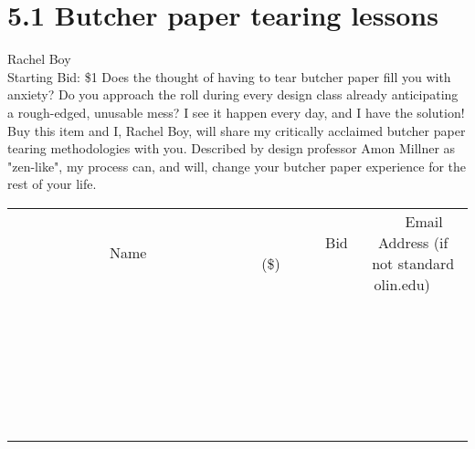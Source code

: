 \documentclass[11pt]{article}
\begin{document}
\section*{5.1 Butcher paper tearing lessons}
Rachel Boy
\\
Starting Bid: \$1
\newline
Does the thought of having to tear butcher paper fill you with anxiety? Do you approach the roll during every design class already anticipating a rough-edged, unusable mess?  I see it happen every day, and I have the solution! Buy this item and I, Rachel Boy, will share my critically acclaimed butcher paper tearing methodologies with you. Described by design professor Amon Millner as "zen-like", my process can, and will, change your butcher paper experience for the rest of your life.
\\[6ex]
\begin{tabular}{c c c}
~~~~~~~~~~~~~Name~~~~~~~~~~~~~ & ~~~~~~~~~Bid (\$)~~~~~~~~~  & ~~~Email Address (if not standard olin.edu)~~~\\
 & & \\
\hline
 & & \\
\hline
 & & \\
\hline
 & & \\
\hline
 & & \\
\hline
 & & \\
\hline
 & & \\
\hline
 & & \\
\hline
 & & \\
\hline
 & & \\
\hline
 & & \\
\hline
 & & \\
\hline
 & & \\
\hline
 & & \\
\hline
 & & \\
\hline
 & & \\
\hline
 & & \\
\hline
 & & \\
\hline
 & & \\
\hline
 & & \\
\hline
 & & \\
\hline
 & & \\
\hline
 & & \\
\hline
 & & \\
\hline
 & & \\
\hline
 & & \\
\hline
\end{tabular}
\newpage
\end{document}
